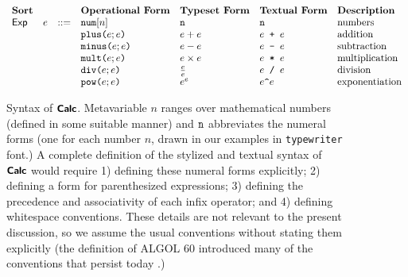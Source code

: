 \begin{figure}
\hspace{-5px}$\begin{array}{lrlllll}
\textbf{Sort} & & & \textbf{Operational Form} & \textbf{Typeset Form} & \textbf{Textual Form} & \textbf{Description}\\
\mathsf{Exp} & e & ::= & \anumintro{n} & \numintro{n} & \numintro{n} & \text{numbers}\\
&&& \aplus{e}{e} & e + e & e\texttt{ + }e & \text{addition} \\
&&& \aminus{e}{e} & e - e & e\texttt{ - }e & \text{subtraction}\\
&&& \amult{e}{e} & e \times e & e\texttt{ * }e & \text{multiplication}\\
&&& \adiv{e}{e} & \frac{e}{e} & e\texttt{ / }e & \text{division}\\
&&& \apow{e}{e} & {e}^{e} & e\verb|^|e & \text{exponentiation}
\end{array}$
\caption[Syntax of $\simplelang$]{Syntax of $\simplelang$. Metavariable $n$ ranges over mathematical numbers (defined in some suitable manner) and $\texttt{n}$ abbreviates the numeral forms (one for each number $n$, drawn in our examples in \texttt{typewriter} font.) A complete definition of the stylized and textual syntax of $\simplelang$ would require 1) defining these numeral forms explicitly; 2) defining a form for parenthesized expressions; 3) defining the precedence and associativity of each infix operator; and 4) defining whitespace conventions. These details are not relevant to the present discussion, so we assume the usual conventions without stating them explicitly (the definition of ALGOL 60 introduced many of the conventions that persist today \cite{naur1963revised}.)}
\label{fig:simple-example}
\end{figure}

